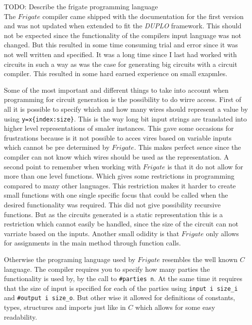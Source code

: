 \documentclass[twoside,11pt,openright]{report}
\newcommand{\todo}[1]{}
\renewcommand{\todo}[1]{{\color{red} TODO: {#1}} \\}
\newcommand{\DUPLO}{\textit{DUPLO} }
\begin{document}
\todo{Describe the frigate programming language}
The $Frigate$ compiler came shipped with the documentation for the first version and was not updated when extended to fit the \DUPLO framework. This should not be expected since the functionality of the compilers input language was not changed. But this resulted in some time consuming trial and error since it was not well written and specified. It was a long time since I last had worked with circuits in such a way as was the case for generating big circuits with a circuit compiler. This resulted in some hard earned experience on small exapmles.

Some of the most important and different things to take into account when programming for circuit generation is the possibility to do wirre access. First of all it is possible to specify which and how many wires should represent a value by using \verb|y=x{index:size}|. This is the way long bit input strings are translated into higher level representations of smaler instances. This gave some occasions for frustrations because is it not possible to acces vires based on variable inputs which cannot be pre determined by $Frigate$. This makes perfect sence since the compiler can not know which wires should be used as the representation.
A second point to remember when working with $Frigate$ is that it do not allow for more than one level functions. Which gives some restrictions in programming compared to many other languages. This restriction makes it harder to create small functions with one single specific focus that could be called when the desired functionality was required. This did not give possibility recursive functions. But as the circuits generated is a static representation this is a restriction which cannot easily be handled, since the size of the circuit can not varriate based on the inputs. Another small odidity is that $Frigate$ only allows for assignments in the main method through function calls.

Otherwise the programing language used by $Frigate$ resembles the well known $C$ language. The compiler requires you to specify how many parties the functionality is used by, by the call to \verb|#parties n|. At the same time it requires that the size of input is specified for each of the parties using \verb|input i size_i| and \verb|#output i size_o|. But other wise it allowed for definitions of constants, types, structures and imports just like in $C$ which allows for some easy readability.

\bigskip
\end{document}

